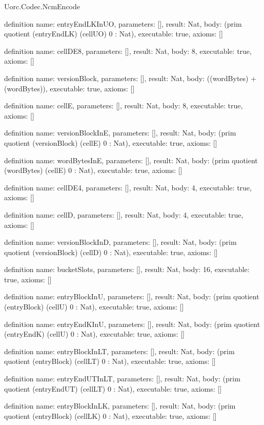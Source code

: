 \begin{lexlean}{Uorc.Codec.NcmEncode}
\begin{semanticmodule}
definition{
  name: entryEndLKInUO,
  parameters: [],
  result: Nat,
  body: (prim quotient (entryEndLK) (cellUO) 0 : Nat),
  executable: true,
  axioms: []
}

definition{
  name: cellDE8,
  parameters: [],
  result: Nat,
  body: 8,
  executable: true,
  axioms: []
}

definition{
  name: versionBlock,
  parameters: [],
  result: Nat,
  body: ((wordBytes) + (wordBytes)),
  executable: true,
  axioms: []
}

definition{
  name: cellE,
  parameters: [],
  result: Nat,
  body: 8,
  executable: true,
  axioms: []
}

definition{
  name: versionBlockInE,
  parameters: [],
  result: Nat,
  body: (prim quotient (versionBlock) (cellE) 0 : Nat),
  executable: true,
  axioms: []
}

definition{
  name: wordBytesInE,
  parameters: [],
  result: Nat,
  body: (prim quotient (wordBytes) (cellE) 0 : Nat),
  executable: true,
  axioms: []
}

definition{
  name: cellDE4,
  parameters: [],
  result: Nat,
  body: 4,
  executable: true,
  axioms: []
}

definition{
  name: cellD,
  parameters: [],
  result: Nat,
  body: 4,
  executable: true,
  axioms: []
}

definition{
  name: versionBlockInD,
  parameters: [],
  result: Nat,
  body: (prim quotient (versionBlock) (cellD) 0 : Nat),
  executable: true,
  axioms: []
}

definition{
  name: bucketSlots,
  parameters: [],
  result: Nat,
  body: 16,
  executable: true,
  axioms: []
}

definition{
  name: entryBlockInU,
  parameters: [],
  result: Nat,
  body: (prim quotient (entryBlock) (cellU) 0 : Nat),
  executable: true,
  axioms: []
}

definition{
  name: entryEndKInU,
  parameters: [],
  result: Nat,
  body: (prim quotient (entryEndK) (cellU) 0 : Nat),
  executable: true,
  axioms: []
}

definition{
  name: entryBlockInLT,
  parameters: [],
  result: Nat,
  body: (prim quotient (entryBlock) (cellLT) 0 : Nat),
  executable: true,
  axioms: []
}

definition{
  name: entryEndUTInLT,
  parameters: [],
  result: Nat,
  body: (prim quotient (entryEndUT) (cellLT) 0 : Nat),
  executable: true,
  axioms: []
}

definition{
  name: entryBlockInLK,
  parameters: [],
  result: Nat,
  body: (prim quotient (entryBlock) (cellLK) 0 : Nat),
  executable: true,
  axioms: []
}


\end{semanticmodule}
\end{lexlean}
